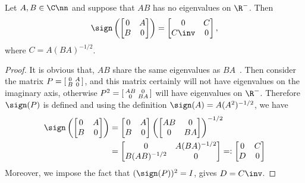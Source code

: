 \begin{theorem} \label{thm.coupled-sign}
Let $A,B\in\C\nn$ and suppose that $AB$ has no eigenvalues on $\R^{-}$.
Then
\begin{equation}\notag
  \sign \left(
  \begin{bmatrix}
    0 & A \\ B & 0
  \end{bmatrix}
  \right) =
  \begin{bmatrix}
    0 & C \\ C\inv & 0 
  \end{bmatrix},
\end{equation}
where $C = A(BA)^{-1/2}$.
\end{theorem}

\begin{proof}
It is obvious that, $AB$
share the same  eigenvalues as $BA$~.
Then consider the matrix 
$P = \begin{bsmallmatrix} 0 & A \\ B & 0 \end{bsmallmatrix}$, and this
matrix certainly will not have eigenvalues on the imaginary axis, otherwise
$P^{2} = \begin{bsmallmatrix} AB & 0 \\ 0 & BA \end{bsmallmatrix}$ will
have eigenvalues on $\R^{-}$. Therefore $\sign(P)$ is defined and using the
definition $\sign(A) = A(A^{2})^{-1/2}$, we have
\begin{align}\notag
  \sign \left(
  \begin{bmatrix}
    0 & A \\ B & 0
  \end{bmatrix}
  \right)
  & =
    \begin{bmatrix}
      0 & A \\ B & 0
    \end{bmatrix}
    \left(
    \begin{bmatrix} AB & 0 \\ 0 & BA \end{bmatrix} 
    \right)^{-1/2}\\
      & =
        \begin{bmatrix}
          0 & A(BA)^{-1/2} \\ B(AB)^{-1/2} & 0
        \end{bmatrix}
        =:
        \begin{bmatrix}
          0 & C \\ D & 0
        \end{bmatrix}
\end{align}
Moreover, we impose the fact that $(\sign(P))^{2} = I$, gives $D = C\inv$.
\end{proof}

